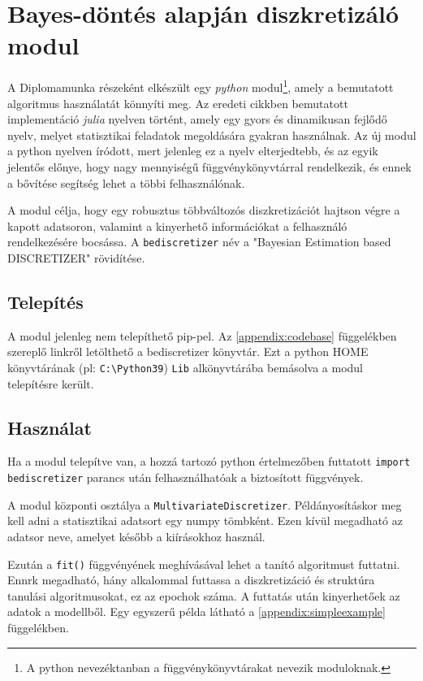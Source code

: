 \chapter{Bayes-döntés alapján diszkretizáló modul}\label{chapter:modul}

\iffalse
A Diplomamunka részeként elkészült egy \textit{python} modul\footnote{A python nevezéktanban a függvénykönyvtárakat nevezik moduloknak.}, amely a bemutatott algoritmus használatát könnyíti meg. Az eredeti cikkben bemutatott implementáció \textit{julia} nyelven történt, amely egy gyors és dinamikusan fejlődő nyelv, melyet statisztikai feladatok megoldására gyakran használnak. Az új modul a python nyelven íródott, mert jelenleg ez a nyelv elterjedtebb, és az egyik jelentős előnye, hogy nagy mennyiségű függvénykönyvtárral rendelkezik, és ennek a bővítése segítség lehet a többi felhasználónak.

A modul célja, hogy egy robusztus többváltozós diszkretizációt hajtson végre a kapott adatsoron, valamint a kinyerhető információkat a felhasználó rendelkezésére bocsássa. A \verb|bediscretizer| név a "Bayesian Estimation based DISCRETIZER" rövidítése.

\section{Telepítés}
A modul jelenleg nem telepíthető pip-pel. Az \ref{appendix:codebase} függelékben szereplő linkről letölthető a bediscretizer könyvtár. Ezt a python HOME könyvtárának (pl: \verb|C:\Python39|) \verb|Lib| alkönyvtárába bemásolva a modul telepítésre került.

\section{Használat}
Ha a modul telepítve van, a hozzá tartozó python értelmezőben futtatott \verb|import bediscretizer| parancs után felhasználhatóak a biztosított függvények.

A modul központi osztálya a \verb|MultivariateDiscretizer|. Példányosításkor meg kell adni a statisztikai adatsort egy numpy tömbként. Ezen kívül megadható az adatsor neve, amelyet később a kiírásokhoz használ.

Ezután a \verb|fit()| függvényének meghívásával lehet a tanító algoritmust futtatni. Ennrk megadható, hány alkalommal futtassa a diszkretizáció és struktúra tanulási algoritmusokat, ez az epochok száma.
A futtatás után kinyerhetőek az adatok a modellből. Egy egyszerű példa látható a \ref{appendix:simpleexample} függelékben.

